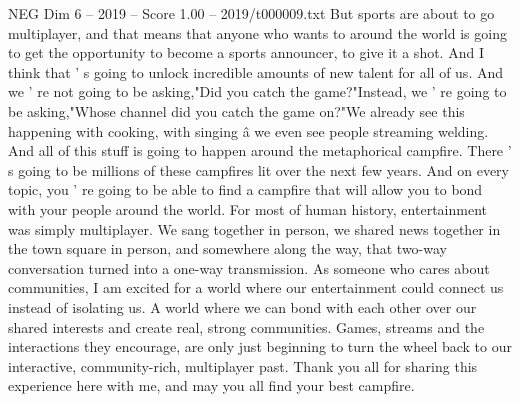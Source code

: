 \begin{textsample}{NEG Dim 6 – 2019 – Score 1.00 – 2019/t000009.txt}
But sports are about to go multiplayer, and that means that anyone who wants to around the world is going to get the opportunity to become a sports announcer, to give it a shot.
And I think that ' s going to unlock incredible amounts of new talent for all of us.
And we ' re not going to be asking,"Did you catch the game?"Instead, we ' re going to be asking,"Whose channel did you catch the game on?"We already see this happening with cooking, with singing â we even see people streaming welding.
And all of this stuff is going to happen around the metaphorical campfire.
There ' s going to be millions of these campfires lit over the next few years.
And on every topic, you ' re going to be able to find a campfire that will allow you to bond with your people around the world.
For most of human history, entertainment was simply multiplayer.
We sang together in person, we shared news together in the town square in person, and somewhere along the way, that two-way conversation turned into a one-way transmission.
As someone who cares about communities, I am excited for a world where our entertainment could connect us instead of isolating us.
A world where we can bond with each other over our shared interests and create real, strong communities.
Games, streams and the interactions they encourage, are only just beginning to turn the wheel back to our interactive, community-rich, multiplayer past.
Thank you all for sharing this experience here with me, and may you all find your best campfire.

\end{textsample}
